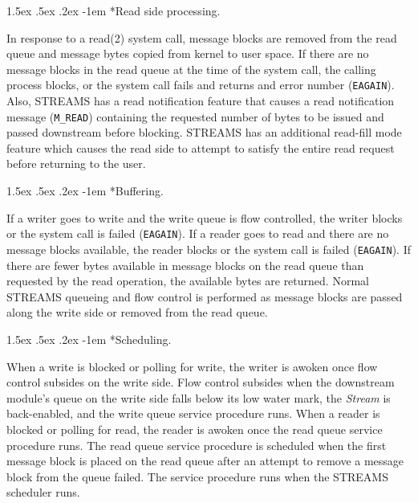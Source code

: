 \documentclass[letterpaper,final,notitlepage,twocolumn,10pt,twoside]{article}
\makeatletter
\let\normalsize = \small
\let\small = \footnotesize
\let\footnotesize = \scriptsize
\let\scriptsize = \tiny
\renewcommand\paragraph{\@startsection{paragraph}{4}{\z@}%
                                    {1.5ex \@plus .5ex \@minus .2ex}%
                                    {-1em}%
                                    {\normalfont\normalsize\bfseries\slshape}}
\makeatother
\begin{document}
\paragraph*{Read side processing.}

In response to a read(2) system call, message blocks are removed from the read queue and message
bytes copied from kernel to user space.  If there are no message blocks in the read queue at the
time of the system call, the calling process blocks, or the system call fails and returns and error
number (\texttt{EAGAIN}).  Also, STREAMS has a read notification feature that causes a read
notification message (\texttt{M\_READ}) containing the requested number of bytes to be issued  and
passed downstream before blocking.  STREAMS has an additional read-fill mode feature which causes
the read side to attempt to satisfy the entire read request before returning to the user.

\paragraph*{Buffering.}

If a writer goes to write and the write queue is flow controlled, the writer blocks or the system
call is failed (\texttt{EAGAIN}).  If a reader goes to read and there are no message blocks
available, the reader blocks or the system call is failed (\texttt{EAGAIN}).  If there are fewer
bytes available in message blocks on the read queue than requested by the read operation, the
available bytes are returned.  Normal STREAMS queueing and flow control is performed as message
blocks are passed along the write side or removed from the read queue.

\paragraph*{Scheduling.}

When a write is blocked or polling for write, the writer is awoken once flow control subsides on the
write side.  Flow control subsides when the downstream module's queue on the write side falls below
its low water mark, the \textit{Stream} is back-enabled, and the write queue service procedure runs.
When a reader is blocked or polling for read, the reader is awoken once the read queue service
procedure runs.  The read queue service procedure is scheduled when the first message block is
placed on the read queue after an attempt to remove a message block from the queue failed.  The
service procedure runs when the STREAMS scheduler runs.
\end{document}
